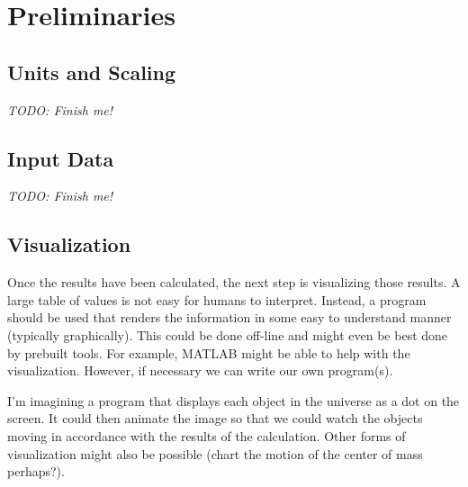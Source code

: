 
\section{Preliminaries}
\label{sec:preliminaries}

\subsection{Units and Scaling}

\textit{TODO: Finish me!}

\subsection{Input Data}

\textit{TODO: Finish me!}

\subsection{Visualization}

Once the results have been calculated, the next step is visualizing those results. A large table
of values is not easy for humans to interpret. Instead, a program should be used that renders
the information in some easy to understand manner (typically graphically). This could be done
off-line and might even be best done by prebuilt tools. For example, MATLAB might be able to
help with the visualization. However, if necessary we can write our own program(s).

I'm imagining a program that displays each object in the universe as a dot on the screen. It
could then animate the image so that we could watch the objects moving in accordance with the
results of the calculation. Other forms of visualization might also be possible (chart the
motion of the center of mass perhaps?).
